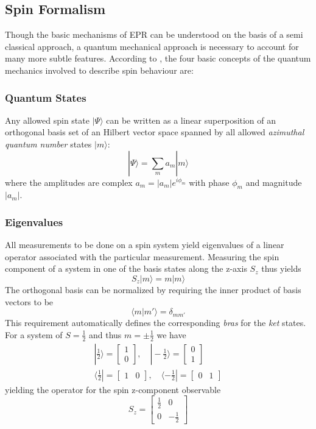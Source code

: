\documentclass[11.5pt,a4paper]{article}
\begin{document}
\subsection{Spin Formalism}
Though the basic mechanisms of EPR can be understood on the basis of a semi classical approach, a quantum mechanical approach is necessary to account for many more subtle features. According to \cite[Chap. 3]{nmr-ox}, the four basic concepts of the quantum mechanics involved to describe spin behaviour are:
\subsubsection{Quantum States}
Any allowed spin state $| \Psi \rangle$ can be written as a linear superposition of an orthogonal basis set of an Hilbert vector space spanned by all allowed \emph{azimuthal quantum number} states $| m \rangle$:
\begin{equation}
 | \Psi \rangle = \sum_m a_m | m \rangle 
\label{eq-orthonormal-basis}
\end{equation}
where the amplitudes are complex $a_m = |a_m| e^{i\phi_m}$ with phase $\phi_m$ and magnitude $|a_m|$.
\subsubsection{Eigenvalues}
All measurements to be done on a spin system yield eigenvalues of a linear operator associated with the particular measurement. Measuring the spin component of a system in one of the basis states along the z-axis $S_z$ thus yields
\begin{equation}
  S_z |m\rangle = m |m\rangle
\end{equation}
The orthogonal basis can be normalized by requiring the inner product of basis vectors to be
\begin{equation}
 \langle m|m'\rangle = \delta_{m m'}
\end{equation}
This requirement automatically defines the corresponding \emph{bras} for the \emph{ket} states. For a system of $S=\frac{1}{2}$ and thus $m=\pm \frac{1}{2}$ we have
\begin{align} 
 |\tfrac{1}{2}\rangle = \begin{bmatrix} 1 \\ 0 \end{bmatrix}, \quad |-\tfrac{1}{2}\rangle = \begin{bmatrix} 0 \\ 1 \end{bmatrix}\\
 \langle\tfrac{1}{2}| = \begin{bmatrix} 1 & 0 \end{bmatrix}, \quad \langle-\tfrac{1}{2}| = \begin{bmatrix} 0 & 1 \end{bmatrix} 
\end{align}
yielding the operator for the spin z-component observable 
\begin{equation}
 S_z = \begin{bmatrix} \tfrac{1}{2} & 0 \\ 0 & -\tfrac{1}{2} \end{bmatrix}
\end{equation}
\end{document}
